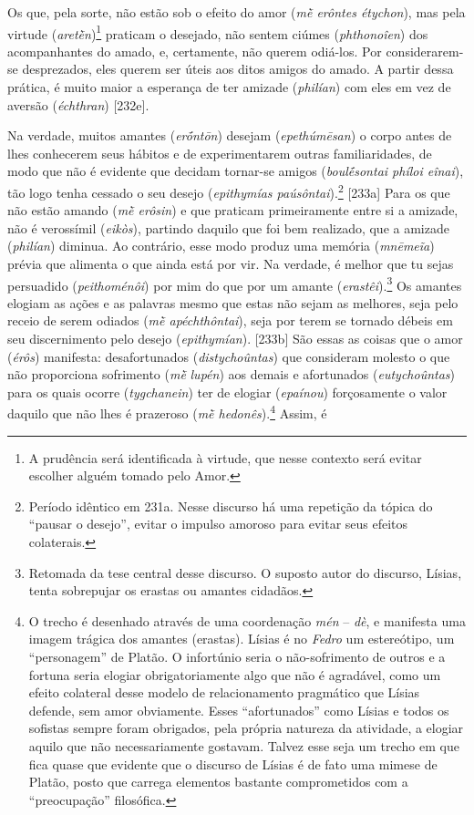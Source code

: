 Os que, pela sorte, não estão sob o efeito do amor (\emph{mḕ erôntes
étychon}), mas pela virtude (\emph{aretḕn})\footnote{A prudência será
  identificada à virtude, que nesse contexto será evitar escolher alguém
  tomado pelo Amor.} praticam o desejado, não sentem ciúmes
(\emph{phthonoîen}) dos acompanhantes do amado, e, certamente, não
querem odiá-los. Por considerarem-se desprezados, eles querem ser úteis
aos ditos amigos do amado. A partir dessa prática, é muito maior a
esperança de ter amizade (\emph{philían}) com eles em vez de aversão
(\emph{échthran}) {[}232e{]}.

Na verdade, muitos amantes (\emph{erṓntōn}) desejam (\emph{epethúmēsan})
o corpo antes de lhes conhecerem seus hábitos e de experimentarem outras
familiaridades, de modo que não é evidente que decidam tornar-se amigos
(\emph{boulḗsontai phíloi eînai}), tão logo tenha cessado o seu desejo
(\emph{epithymías paúsôntai}).\footnote{Período idêntico em 231a. Nesse
  discurso há uma repetição da tópica do ``pausar o desejo'', evitar o
  impulso amoroso para evitar seus efeitos colaterais.} {[}233a{]} Para
os que não estão amando (\emph{mḕ erôsin}) e que praticam primeiramente
entre si a amizade, não é verossímil (\emph{eikòs}), partindo daquilo
que foi bem realizado, que a amizade (\emph{philían}) diminua. Ao
contrário, esse modo produz uma memória (\emph{mnēmeĩa}) prévia que
alimenta o que ainda está por vir. Na verdade, é melhor que tu sejas
persuadido (\emph{peithoménôi}) por mim do que por um amante
(\emph{erastêi}).\footnote{Retomada da tese central desse discurso. O
  suposto autor do discurso, Lísias, tenta sobrepujar os erastas ou
  amantes cidadãos.} Os amantes elogiam as ações e as palavras mesmo que
estas não sejam as melhores, seja pelo receio de serem odiados (\emph{mḕ
apéchthôntai}), seja por terem se tornado débeis em seu discernimento
pelo desejo (\emph{epithymían}). {[}233b{]} São essas as coisas que o
amor (\emph{érôs}) manifesta: desafortunados (\emph{distychoûntas}) que
consideram molesto o que não proporciona sofrimento (\emph{mḕ}
\emph{lupén}) aos demais e afortunados (\emph{eutychoûntas}) para os
quais ocorre (\emph{tygchanein}) ter de elogiar (\emph{epaínou})
forçosamente o valor daquilo que não lhes é prazeroso (\emph{mḕ
hedonês}).\footnote{O trecho é desenhado através de uma coordenação
  \emph{mén} -- \emph{dè}, e manifesta uma imagem trágica dos amantes
  (erastas). Lísias é no \emph{Fedro} um estereótipo, um ``personagem''
  de Platão. O infortúnio seria o não-sofrimento de outros e a fortuna
  seria elogiar obrigatoriamente algo que não é agradável, como um
  efeito colateral desse modelo de relacionamento pragmático que Lísias
  defende, sem amor obviamente. Esses ``afortunados'' como Lísias e
  todos os sofistas sempre foram obrigados, pela própria natureza da
  atividade, a elogiar aquilo que não necessariamente gostavam. Talvez
  esse seja um trecho em que fica quase que evidente que o discurso de
  Lísias é de fato uma mimese de Platão, posto que carrega elementos
  bastante comprometidos com a ``preocupação'' filosófica.} Assim, é
